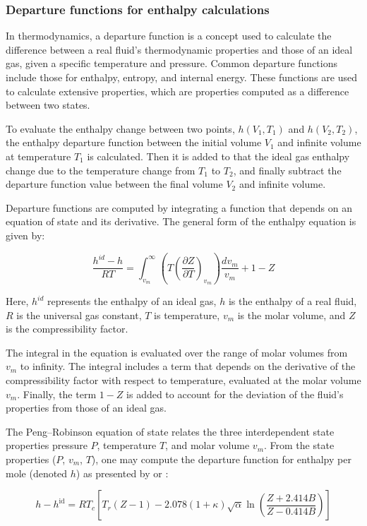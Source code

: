 \documentclass[../Article_Model_Parameters.tex]{subfiles}
\begin{document}
	\subsubsection{Departure functions for enthalpy calculations} \label{CH:Enthalpy}
	
	In thermodynamics, a departure function is a concept used to calculate the difference between a real fluid's thermodynamic properties and those of an ideal gas, given a specific temperature and pressure. Common departure functions include those for enthalpy, entropy, and internal energy. These functions are used to calculate extensive properties, which are properties computed as a difference between two states.
	
	To evaluate the enthalpy change between two points, $h(V_1,T_1)$ and $h(V_2,T_2)$, the enthalpy departure function between the initial volume $V_1$ and infinite volume at temperature $T_1$ is calculated. Then it is added to that the ideal gas enthalpy change due to the temperature change from $T_1$ to $T_2$, and finally subtract the departure function value between the final volume $V_2$ and infinite volume.
	
	Departure functions are computed by integrating a function that depends on an equation of state and its derivative. The general form of the enthalpy equation is given by:
	
	{\footnotesize
		\begin{equation}
			\frac{h^{id}-h}{RT} =\int_{v_m}^{\infty }\left(T\left({\frac{\partial Z}{\partial T}}\right)_{v_m}\right){\frac{dv_m}{v_m}} + 1-Z
		\end{equation}
	}
	
	Here, $h^{id}$ represents the enthalpy of an ideal gas, $h$ is the enthalpy of a real fluid, $R$ is the universal gas constant, $T$ is temperature, $v_m$ is the molar volume, and $Z$ is the compressibility factor.
	
	The integral in the equation is evaluated over the range of molar volumes from $v_m$ to infinity. The integral includes a term that depends on the derivative of the compressibility factor with respect to temperature, evaluated at the molar volume $v_m$. Finally, the term $1-Z$ is added to account for the deviation of the fluid's properties from those of an ideal gas.
	
	The Peng–Robinson equation of state relates the three interdependent state properties pressure $P$, temperature $T$, and molar volume $v_m$. From the state properties ($P$, $v_m$, $T$), one may compute the departure function for enthalpy per mole (denoted $h$) as presented by \citet{Gmehling2019} or \citet{Elliott2011}:
	
	{\footnotesize
		\begin{equation}
			h-h^{\mathrm {id} }=RT_c\left[T_{r}(Z-1)-2.078(1+\kappa ){\sqrt {\alpha }}\ln \left({\frac {Z+2.414B}{Z-0.414B}}\right)\right]
		\end{equation}
	}
	
\end{document}
